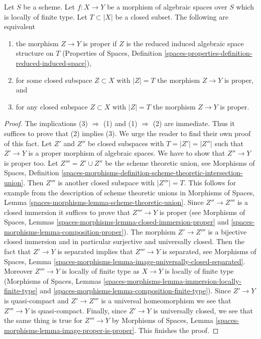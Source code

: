 \begin{lemma}
\label{lemma-closed-proper-over-base}
Let $S$ be a scheme. Let $f : X \to Y$ be a morphism of algebraic spaces
over $S$ which is locally of finite type. Let $T \subset |X|$ be a closed
subset. The following are equivalent
\begin{enumerate}
\item the morphism $Z \to Y$ is proper if $Z$ is the reduced
induced algebraic space structure on $T$
(Properties of Spaces, Definition
\ref{spaces-properties-definition-reduced-induced-space}),
\item for some closed subspace $Z \subset X$ with $|Z| = T$
the morphism $Z \to Y$ is proper, and
\item for any closed subspace $Z \subset X$ with $|Z| = T$ the morphism
$Z \to Y$ is proper.
\end{enumerate}
\end{lemma}

\begin{proof}
The implications (3) $\Rightarrow$ (1) and (1) $\Rightarrow$ (2)
are immediate. Thus it suffices to prove that (2) implies (3).
We urge the reader to find their own proof of this fact.
Let $Z'$ and $Z''$ be closed subspaces with $T = |Z'| = |Z''|$
such that $Z' \to Y$ is a proper morphism of algebraic spaces.
We have to show that $Z'' \to Y$ is proper too.
Let $Z''' = Z' \cup Z''$ be the scheme theoretic union, see
Morphisms of Spaces, Definition
\ref{spaces-morphisms-definition-scheme-theoretic-intersection-union}.
Then $Z'''$ is another closed subspace with $|Z'''| = T$.
This follows for example from the description of scheme theoretic unions in
Morphisms of Spaces, Lemma \ref{spaces-morphisms-lemma-scheme-theoretic-union}.
Since $Z'' \to Z'''$ is a closed immersion it suffices to prove
that $Z''' \to Y$ is proper (see
Morphisms of Spaces, Lemmas
\ref{spaces-morphisms-lemma-closed-immersion-proper} and
\ref{spaces-morphisms-lemma-composition-proper}).
The morphism $Z' \to Z'''$ is a bijective closed immersion
and in particular surjective and universally closed.
Then the fact that $Z' \to Y$ is separated implies that
$Z''' \to Y$ is separated, see
Morphisms of Spaces, Lemma
\ref{spaces-morphisms-lemma-image-universally-closed-separated}.
Moreover $Z''' \to Y$ is locally of finite type
as $X \to Y$ is locally of finite type
(Morphisms of Spaces, Lemmas
\ref{spaces-morphisms-lemma-immersion-locally-finite-type} and
\ref{spaces-morphisms-lemma-composition-finite-type}).
Since $Z' \to Y$ is quasi-compact and $Z' \to Z'''$ is a
universal homeomorphism we see that $Z''' \to Y$ is quasi-compact.
Finally, since $Z' \to Y$ is universally closed, we see that
the same thing is true for $Z''' \to Y$ by
Morphisms of Spaces, Lemma \ref{spaces-morphisms-lemma-image-proper-is-proper}.
This finishes the proof.
\end{proof}

